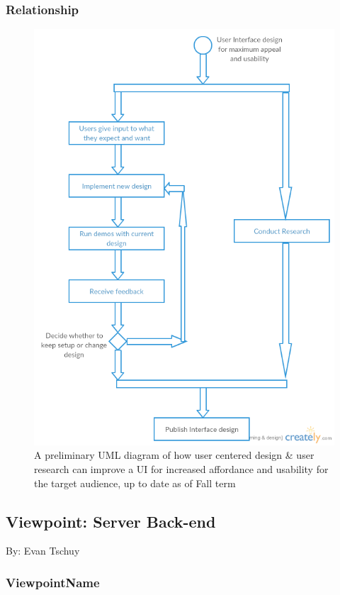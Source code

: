 \documentclass[letterpaper, 10pt, draftclsnofoot, compsoc, onecolumn]{IEEEtran}
\begin{document}
\newpage
\subsubsection{Relationship}
\begin{figure}[ht!]
\centering
\includegraphics[width=120mm]{interface_design.png}
\caption{A preliminary UML diagram of how user centered design \& user research can 
improve a UI for increased affordance and usability for the target 
audience, up to date as of Fall term}
\end{figure}





\newpage
\subsection{Viewpoint: Server Back-end}
{\noindent By: Evan Tschuy \par}

\subsubsection{ViewpointName}
{\noindent  \par}
\end{document}

